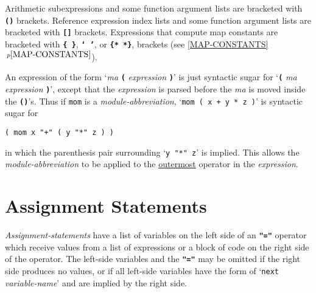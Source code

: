\documentclass[12pt]{article}
\newcommand{\TT}[1]{{\tt \bfseries #1}}
\newcommand{\itemref}[1]{\ref{#1}$\,^{p\pageref{#1}}$}
\begin{document}
Arithmetic subexpressions and some function argument lists are bracketed
with \TT{()} brackets.  Reference expression index lists and some function
argument lists are bracketed with \TT{[]} brackets.
Expressions that compute map constants
are bracketed with \TT{\{~\}}, \TT{`~'}, or \TT{\{*~*\}},
brackets (see \itemref{MAP-CONSTANTS}).

An expression of the form `{\em ma} \TT{(} {\em expression} \TT{)}' is%
\label{MA-SYNTACTIC-SUGAR}
just syntactic sugar for `\TT{(} {\em ma} {\em expression} \TT{)}', except
that the {\em expression} is parsed before the {\em ma} is moved inside the
\TT{()}'s.  Thus if {\tt mom} is a {\em module-abbreviation},
`{\tt mom ( x + y * z )}' is syntactic sugar for \\
\centerline{\tt ( mom x "+" ( y "*" z ) )}
in which the parenthesis pair surrounding `{\tt y "*" z}' is implied.
This allows the {\em module-abbre\-via\-tion} to be applied to the
\underline{outermost} operator in the {\em expression}.

\section{Assignment Statements}
\label{ASSIGNMENT-STATEMENTS}

{\em Assignment-statements} have a list of variables on the
left side of an \TT{"="} operator
which receive values from a list of expressions or
a block of code on the right side of the operator.  The left-side variables
and the \TT{"="}
may be omitted if the right side produces no values,
or if all left-side variables
have the form of `{\tt next} {\em variable-name}' and are
implied by the right side.
\end{document}
